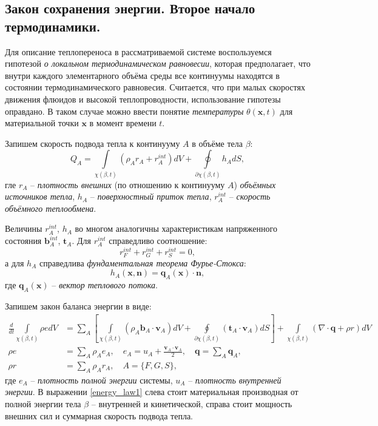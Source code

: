 \subsection{Закон сохранения энергии. Второе начало термодинамики.}

	Для описание теплопереноса в рассматриваемой системе воспользуемся гипотезой \textit{о локальном термодинамическом равновесии}, которая предполагает, что внутри каждого элементарного объёма среды все континуумы находятся в состоянии термодинамического равновесия. Считается, что при малых скоростях движения флюидов и высокой теплопроводности, использование гипотезы оправдано. В таком случае можно ввести понятие \textit{температуры} $\theta(\boldsymbol{x}, t)$ для материальной точки $\boldsymbol{x}$ в момент времени $t$.

	Запишем скорость подвода тепла к континууму $A$ в объёме тела $\beta$:
\begin{equation}
	\label{heat_supply}
	Q_A = \int\limits_{\chi(\beta, t)}(\rho_A r_A + r_A^{int})dV + \oint\limits_{\partial \chi(\beta, t)} h_A dS,
\end{equation}
	гле $r_A$ -- \textit{плотность внешних} (по отношению к континууму $A$) \textit{объёмных источников тепла},
	$h_A$ -- \textit{поверхностный приток тепла},
	$r_A^{int}$ -- \textit{скорость объёмного теплообмена}.

	Величины $r_A^{int}$, $h_A$ во многом аналогичны характеристикам напряженного состояния $\boldsymbol{b}_A^{int}$, $\boldsymbol{t}_A$. Для $r_A^{int}$ справедливо соотношение:
\begin{equation}
	\label{heat_exchange}
	r_F^{int} + r_G^{int} + r_S^{int} = 0,
\end{equation}
	а для $h_A$ справедлива \textit{фундаментальная теорема Фурье-Стокса}:
\begin{equation}
	\label{fourier_stocks}
	h_A(\boldsymbol{x}, \boldsymbol{n}) = \boldsymbol{q}_A(\boldsymbol{x}) \cdot \boldsymbol{n},
\end{equation}
	где $\boldsymbol{q}_A(\boldsymbol{x})$ -- \textit{вектор теплового потока}.

	Запишем закон баланса энергии в виде:
\begin{align}
	\label{energy_law1}
	\frac{d}{dt}\int\limits_{\chi(\beta, t)} \rho e dV &= \sum_A\left[\int\limits_{\chi(\beta, t)}\left(\rho_A\boldsymbol{b}_A\cdot\boldsymbol{v}_A\right)dV + \oint\limits_{\partial\chi(\beta, t)}\left(\boldsymbol{t}_A \cdot \boldsymbol{v}_A\right)dS\right] + \int\limits_{\chi(\beta, t)}\left(\nabla \cdot \boldsymbol{q} + \rho r\right)dV\\
	\label{energy_law2}
	\rho e &= \sum_A \rho_A e_A, \quad e_A = u_A + \frac{\boldsymbol{v}_A \cdot \boldsymbol{v}_A}{2}, \quad \boldsymbol{q} = \sum\limits_A \boldsymbol{q}_A,\\
	\label{energy_law3}
	\rho r &= \sum\limits_{A} \rho_A r_A, \quad A = \{F, G, S\},
\end{align}
	где $e_A$ -- \textit{плотность полной энергии} системы,
	$u_A$ -- \textit{плотность внутренней энергии}.
	В выражении \eqref{energy_law1} слева стоит материальная производная от полной энергии тела $\beta$ -- внутренней и кинетической, справа стоит мощность внешних сил и суммарная скорость подвода тепла.

